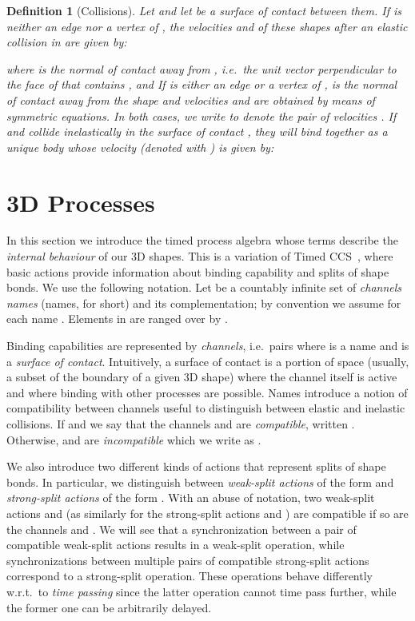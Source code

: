 \documentclass[11pt]{article}
\newtheorem{definition}{Definition}
\begin{document}
\begin{definition}[Collisions]
\label{def:collisions}
Let  and let  be a surface of contact between them. If  is neither an edge nor a vertex of , the velocities  and  of these shapes after an elastic collision in  are given by:

\noindent where  is the normal of contact away from , i.e.\
the unit vector perpendicular to the face of  that contains , and
If  is either an edge or a vertex of ,  is the normal of contact away from the
shape  and velocities  and  are obtained by means of
symmetric equations. In both cases, we write  to denote the pair
of velocities . If  and  collide inelastically in the surface of
contact , they will bind together as a unique body whose velocity (denoted with
) is given by:

\end{definition}


\section{3D Processes}
\label{sec:three}
In this section we introduce the timed process algebra whose terms describe the {\em internal
behaviour} of our 3D shapes. This is a variation of Timed CCS~\cite{Yi1990}, where basic actions
provide information about binding capability and splits of shape bonds. We use the following
notation. Let  be a countably infinite set of {\em channels names}
(names, for short) and  its
complementation; by convention we assume  for each name . Elements
in  are ranged over by .

Binding capabilities are represented by {\em channels}, i.e.\ pairs  where  is a name and  is a {\em surface of contact}. Intuitively, a surface
of contact is a portion of space (usually, a subset of the boundary of a given 3D shape) where the
channel itself is active and where binding with other processes are possible. Names introduce a
notion of compatibility between channels useful to distinguish between elastic and inelastic
collisions. If  and  we say that the channels
 and  are {\em compatible}, written  . Otherwise,  and
 are {\em incompatible} which we write as .

We also introduce two  different kinds of actions that represent splits of shape bonds. In particular, we distinguish between {\em weak-split actions} of the form  and {\em strong-split actions} of the form . With an abuse of notation, two weak-split actions  and  (as similarly for the strong-split actions  and ) are compatible if so are the channels  and . We will see that a synchronization between a pair of compatible weak-split actions results in a weak-split operation, while synchronizations between multiple pairs of compatible strong-split actions correspond to a strong-split operation. These operations behave differently w.r.t.\ to {\em time passing} since the latter operation cannot time pass further, while the former one can be arbitrarily delayed.
\end{document}

